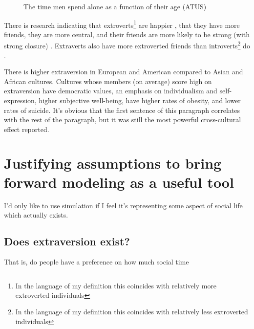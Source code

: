 \documentclass[]{article}
\begin{document}
	\begin{figure}
		\centering
		\caption{The time men spend alone as a function of their age (ATUS)}
		\label{fig:male-alone-time-as-we-age}
	\end{figure}

	There is research indicating that extroverts\footnote{In the language of my definition this coincides with relatively more extroverted individuals} are happier \cite{Oerlemans2014}, that they have more friends, they are more central, and their friends are more likely to be strong (with strong closure) \cite{Staiano2012}. Extraverts also have more extroverted friends than introverts\footnote{In the language of my definition this coincides with relatively less extroverted individuals} do \cite{Feiler2014}.
	
	There is higher extraversion in European and American compared to Asian and African cultures. 
	Cultures whose members (on average) score high on extraversion have democratic values, an emphasis on individualism and self-expression, higher subjective well-being, have higher rates of obesity, and lower rates of suicide. \cite{Terracciano2006}
	It's obvious that the first sentence of this paragraph correlates with the rest of the paragraph, but it was still the most powerful cross-cultural effect reported.
	
	\section{Justifying assumptions to bring forward modeling as a useful tool}
	I'd only like to use simulation if I feel it's representing some aspect of social life which actually exists. 
	\subsection{Does extraversion exist?}
	That is, do people have a preference on how much social time
\end{document}
